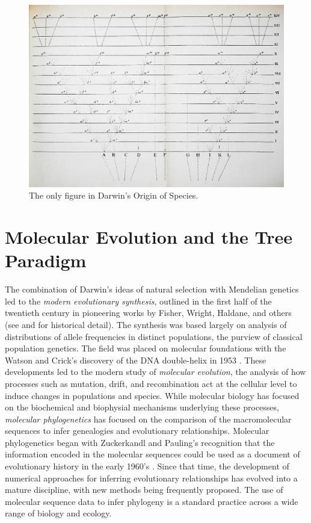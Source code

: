 \begin{figure}
\centering
\includegraphics[width=.75\columnwidth]{./fig/introduction/Darwin_divergence.jpg}
\caption[Charles Darwin's Tree]{The only figure in Darwin's Origin of Species.}
\label{fig:darwin_origin}
\end{figure}

\section{Molecular Evolution and the Tree Paradigm}

The combination of Darwin's ideas of natural selection with Mendelian genetics led to the \emph{modern evolutionary synthesis}, outlined in the first half of the twentieth century in pioneering works by Fisher, Wright, Haldane, and others (see \cite{Huxley:1942} and \cite{Gould:2002ts} for historical detail).
The synthesis was based largely on analysis of distributions of allele frequencies in distinct populations, the purview of classical population genetics.
The field was placed on molecular foundations with the Watson and Crick's discovery of the DNA double-helix in 1953 \cite{Watson:1953wm}.
These developments led to the modern study of \emph{molecular evolution}, the analysis of how processes such as mutation, drift, and recombination act at the cellular level to induce changes in populations and species.
While molecular biology has focused on the biochemical and biophysial mechanisms underlying these processes, \emph{molecular phylogenetics} has focused on the comparison of the macromolecular sequences to infer genealogies and evolutionary relationships.
Molecular phylogenetics began with Zuckerkandl and Pauling's recognition that the information encoded in the molecular sequences could be used as a document of evolutionary history in the early 1960's \cite{Zuckerkandl:1962,Zuckerkandl:1965wi}.
Since that time, the development of numerical approaches for inferring evolutionary relationships has evolved into a mature discipline, with new methods being frequently proposed.
The use of molecular sequence data to infer phylogeny is a standard practice across a wide range of biology and ecology.


